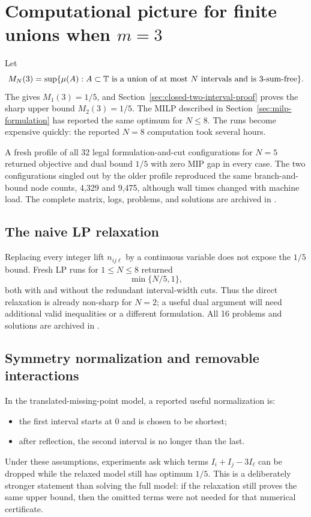\section{Computational picture for finite unions when \texorpdfstring{$m=3$}{m=3}}
\label{sec:m3-computational-picture}

Let
\[
    M_N(3)=\sup\{\mu(A): A\subset\mathbb T\text{ is a union of at most }N
    \text{ intervals and is }3\text{-sum-free}\}.
\]
The 
gives \(M_1(3)=1/5\), and
Section~\ref{sec:closed-two-interval-proof} proves the sharp upper bound
\(M_2(3)=1/5\).  The MILP described in Section~\ref{sec:milp-formulation} has
reported the same optimum for \(N\leq8\).  The runs become expensive quickly:
the reported \(N=8\) computation took several hours.

A fresh profile of all 32 legal formulation-and-cut configurations for
\(N=5\) returned objective and dual bound \(1/5\) with zero MIP gap in every
case.  The two configurations singled out by the older profile reproduced
the same branch-and-bound node counts, 4,329 and 9,475, although wall times
changed with machine load.  The complete matrix, logs, problems, and solutions
are archived in
.

\subsection{The naive LP relaxation}

Replacing every integer lift \(n_{ij\ell}\) by a continuous variable does not
expose the \(1/5\) bound.  Fresh LP runs for \(1\leq N\leq8\) returned
\[
    \min\{N/5,1\},
\]
both with and without the redundant interval-width cuts.  Thus the direct
relaxation is already non-sharp for \(N=2\); a useful dual argument will need
additional valid inequalities or a different formulation.  All 16 problems
and solutions are archived in
.

\subsection{Symmetry normalization and removable interactions}

In the translated-missing-point model, a reported useful normalization is:
\begin{itemize}
    \item the first interval starts at \(0\) and is chosen to be shortest;
    \item after reflection, the second interval is no longer than the last.
\end{itemize}
Under these assumptions, experiments ask which terms
\(I_i+I_j-3I_\ell\) can be dropped while the relaxed model still has optimum
\(1/5\).  This is a deliberately stronger statement than solving the full
model: if the relaxation still proves the same upper bound, then the omitted
terms were not needed for that numerical certificate.

